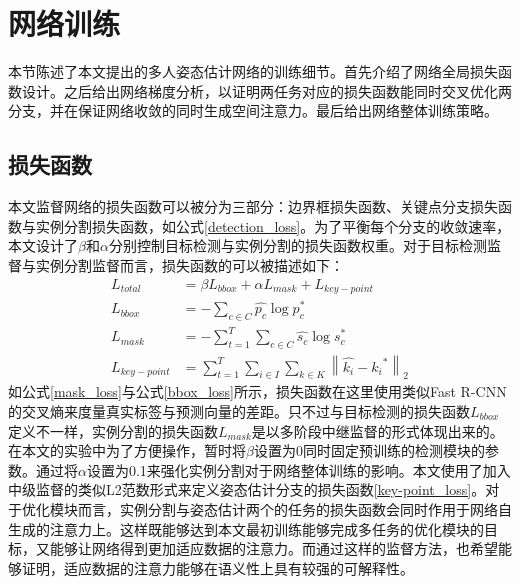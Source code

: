 \section{网络训练}
\label{sec:training}
本节陈述了本文提出的多人姿态估计网络的训练细节。首先介绍了网络全局损失函数设计。之后给出网络梯度分析，以证明两任务对应的损失函数能同时交叉优化两分支，并在保证网络收敛的同时生成空间注意力。最后给出网络整体训练策略。
\subsection{损失函数}
\label{subsec:lossfunction}

本文监督网络的损失函数可以被分为三部分：边界框损失函数、关键点分支损失函数与实例分割损失函数，如公式\eqref{detection_loss}。为了平衡每个分支的收敛速率，本文设计了$\beta$和$\alpha$分别控制目标检测与实例分割的损失函数权重。对于目标检测监督与实例分割监督而言，损失函数的可以被描述如下：
\begin{align}
L_{total} &= \beta L_{bbox} + \alpha L_{mask} + L_{key-point}\label{detection_loss}\\
L_{bbox} &= -\sum_{c \in C}{\hat{p_c} \log{p_c^{*}}}\label{bbox_loss}\\
L_{mask} &= -\sum_{t=1}^{T}\sum_{c \in C}{\hat{s_c} \log{s_c^{*}}}\label{mask_loss}\\
L_{key-point} &= \sum_{t=1}^{T}\sum_{i \in I}\sum_{k \in K}{\left\| \hat{k_i} - {k_i}^{*} \right\|_2}\label{key-point_loss}
\end{align}
如公式\eqref{mask_loss}与公式\eqref{bbox_loss}所示，损失函数在这里使用类似Fast R-CNN\cite{Girshick2015Fast}的交叉熵来度量真实标签与预测向量的差距。只不过与目标检测的损失函数$L_{bbox}$定义不一样，实例分割的损失函数$L_{mask}$是以多阶段中继监督的形式体现出来的。在本文的实验中为了方便操作，暂时将$\beta$设置为0同时固定预训练的检测模块的参数。通过将$\alpha$设置为0.1来强化实例分割对于网络整体训练的影响。本文使用了加入中级监督的类似L2范数形式来定义姿态估计分支的损失函数\eqref{key-point_loss}。对于优化模块而言，实例分割与姿态估计两个的任务的损失函数会同时作用于网络自生成的注意力上。这样既能够达到本文最初训练能够完成多任务的优化模块的目标，又能够让网络得到更加适应数据的注意力。而通过这样的监督方法，也希望能够证明，适应数据的注意力能够在语义性上具有较强的可解释性。



